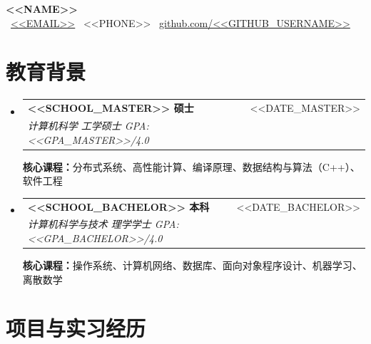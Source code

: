 \documentclass[a4paper,11pt]{article}
\makeatletter
\newcommand{\resumeEduSubheading}[3]{
  \item
  \begin{tabular*}{\linewidth}[t]{@{}l@{\extracolsep{\fill}}r@{}}
    \textbf{#1} & \small #2 \\
    \textit{\small #3} &
  \end{tabular*}\vspace{1pt}
}
\newcommand{\resumeEduLine}[1]{%
  \noindent\parbox[t]{\linewidth}{\small #1}\par
}
\makeatother
\begin{document}
\begin{center}
  {\LARGE \bfseries <<NAME>>} \\[6pt]
  \small
  \faEnvelope\ \href{mailto:<<EMAIL>>}{<<EMAIL>>} \quad
  \faPhone\ <<PHONE>> \quad
  \faGithub\ \href{https://github.com/<<GITHUB_USERNAME>>}{github.com/<<GITHUB_USERNAME>>}
\end{center}

\section{\textcolor{blue!60!black}{教育背景}}

\begin{itemize}[label={},leftmargin=0pt]

\resumeEduSubheading
{<<SCHOOL_MASTER>>   硕士}
{\quad <<DATE_MASTER>>}
{计算机科学 工学硕士 \quad GPA: <<GPA_MASTER>>/4.0}
\resumeEduLine{\textbf{核心课程：}分布式系统、高性能计算、编译原理、数据结构与算法（C++）、软件工程}

\vspace{3pt}

\resumeEduSubheading
{<<SCHOOL_BACHELOR>>  本科}
{\quad <<DATE_BACHELOR>>}
{计算机科学与技术 理学学士 \quad GPA: <<GPA_BACHELOR>>/4.0}
\resumeEduLine{\textbf{核心课程：}操作系统、计算机网络、数据库、面向对象程序设计、机器学习、离散数学}

\end{itemize}


\section{\textcolor{blue!60!black}{项目与实习经历}}
\end{document}
